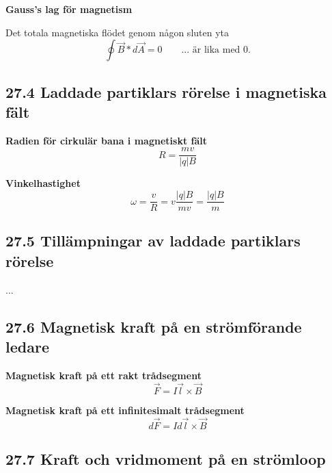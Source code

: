 \documentclass[a4paper]{article}
\begin{document}
\textbf{Gauss's lag för magnetism}

Det totala magnetiska flödet genom någon sluten yta 
\begin{equation}
\oint \vec{B}*d \vec{A} = 0 \qquad \text{... är lika med 0.}
\end{equation}

\subsection*{27.4 Laddade partiklars rörelse i magnetiska fält}
\textbf{Radien för cirkulär bana i magnetiskt fält}
\begin{equation}
R = \dfrac{mv}{|q|B}
\end{equation}

\textbf{Vinkelhastighet}
\begin{equation}
\omega = \dfrac{v}{R} = v \dfrac{|q|B}{mv} = \dfrac{|q|B}{m}
\end{equation}

\subsection*{27.5 Tillämpningar av laddade partiklars rörelse}
...

\subsection*{27.6 Magnetisk kraft på en strömförande ledare}
\textbf{Magnetisk kraft på ett rakt trådsegment}
\begin{equation}
\vec{F} = I \vec{l} \times \vec{B}
\end{equation}

\textbf{Magnetisk kraft på ett infinitesimalt trådsegment}
\begin{equation}
d \vec{F} = I d \vec{l} \times \vec{B}
\end{equation}

\subsection*{27.7 Kraft och vridmoment på en strömloop}
\end{document}
